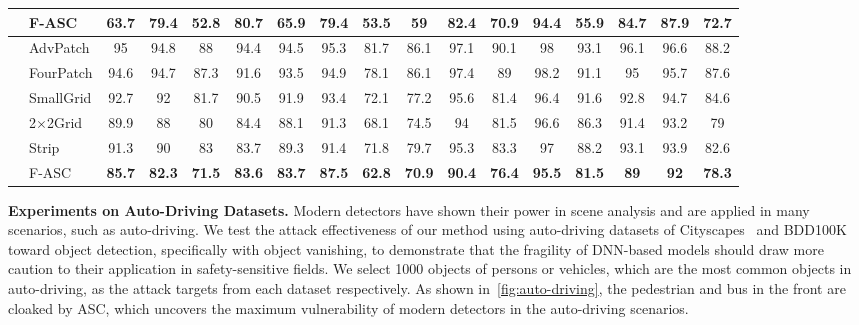 \documentclass[times,twocolumn,final,authoryear]{elsarticle}
\begin{document}
\begin{table*}[!h]
{\begin{tabular}{l|l|ccccccccccccccc}
     & F-ASC          & \textbf{63.7} & \textbf{79.4}     & \textbf{52.8}      & 80.7      & \textbf{65.9} & \textbf{79.4}  & \textbf{53.5}      & \textbf{59}   & \textbf{82.4} & \textbf{70.9} & \textbf{94.4}      & \textbf{55.9}          & \textbf{84.7}       & \textbf{87.9}        & \textbf{72.7}   \\ \hline
{} & AdvPatch       & 95   & 94.8     & 88        & 94.4      & 94.5 & 95.3  & 81.7      & 86.1 & 97.1 & 90.1 & 98        & 93.1          & 96.1       & 96.6        & 88.2   \\
     & FourPatch      & 94.6 & 94.7     & 87.3      & 91.6      & 93.5 & 94.9  & 78.1      & 86.1 & 97.4 & 89   & 98.2      & 91.1          & 95         & 95.7        & 87.6   \\
     & SmallGrid      & 92.7 & 92       & 81.7      & 90.5      & 91.9 & 93.4  & 72.1      & 77.2 & 95.6 & 81.4 & 96.4      & 91.6          & 92.8       & 94.7        & 84.6   \\
     & 2$\times$2Grid & 89.9 & 88       & 80        & 84.4      & 88.1 & 91.3  & 68.1      & 74.5 & 94   & 81.5 & 96.6      & 86.3          & 91.4       & 93.2        & 79     \\
     & Strip          & 91.3 & 90       & 83        & 83.7      & 89.3 & 91.4  & 71.8      & 79.7 & 95.3 & 83.3 & 97        & 88.2          & 93.1       & 93.9        & 82.6   \\
     & F-ASC          & \textbf{85.7} & \textbf{82.3}     & \textbf{71.5}      & \textbf{83.6}      & \textbf{83.7} & \textbf{87.5}  & \textbf{62.8}      & \textbf{70.9} & \textbf{90.4} & \textbf{76.4} & \textbf{95.5}      & \textbf{81.5}          & \textbf{89}         & \textbf{92}          & \textbf{78.3} \\ \hline 
\end{tabular}
}
\label{tab:black}
\end{table*}




\textbf{Experiments on Auto-Driving Datasets.} Modern detectors have shown their power in scene analysis and are applied in many scenarios, such as auto-driving. We test the attack effectiveness of our method using auto-driving datasets of Cityscapes~\citep{Cordts2016Cityscapes} and BDD100K~\citep{bdd100k} toward object detection, specifically with object vanishing, to demonstrate that the fragility of DNN-based models should draw more caution to their application in safety-sensitive fields. We select 1000 objects of persons or vehicles, which are the most common objects in auto-driving, as the attack targets from each dataset respectively. As shown in~\cref{fig:auto-driving}, the pedestrian and bus in the front are cloaked by ASC, which uncovers the maximum vulnerability of modern detectors in the auto-driving scenarios. 
\end{document}
